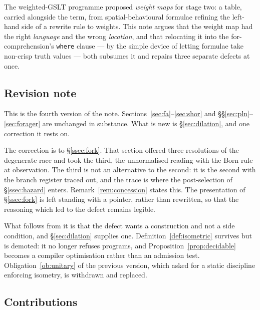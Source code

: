 \documentclass[11pt,a4paper]{article}
\theoremstyle{plain}
\theoremstyle{definition}
\theoremstyle{remark}
\begin{document}
The weighted-GSLT programme proposed \emph{weight maps} for stage two: a table,
carried alongside the term, from spatial-behavioural formulae refining the
left-hand side of a rewrite rule to weights. This note argues that the weight map
had the right \emph{language} and the wrong \emph{location}, and that relocating
it into the for-comprehension's \texttt{where} clause --- by the simple device of
letting formulae take non-crisp truth values --- both subsumes it and repairs
three separate defects at once.

\subsection{Revision note}\label{ssec:revision}

This is the fourth version of the note. Sections~\ref{sec:fa}--\ref{sec:shor}
and \S\S\ref{sec:pln}--\ref{sec:forager} are unchanged in substance. What is new
is \S\ref{sec:dilation}, and one correction it rests on.

The correction is to \S\ref{ssec:fork}. That section offered three resolutions of
the degenerate race and took the third, the unnormalised reading with the Born
rule at observation. The third is not an alternative to the second: it is the
second with the branch register traced out, and the trace is where the
post-selection of \S\ref{ssec:hazard} enters. Remark~\ref{rem:concession} states
this. The presentation of \S\ref{ssec:fork} is left standing with a pointer,
rather than rewritten, so that the reasoning which led to the defect remains
legible.

What follows from it is that the defect wants a construction and not a side
condition, and \S\ref{sec:dilation} supplies one. Definition~\ref{def:isometric}
survives but is demoted: it no longer refuses programs, and
Proposition~\ref{prop:decidable} becomes a compiler optimisation rather than an
admission test. Obligation~\ref{ob:unitary} of the previous version, which asked
for a static discipline enforcing isometry, is withdrawn and replaced.

\subsection{Contributions}
\end{document}
